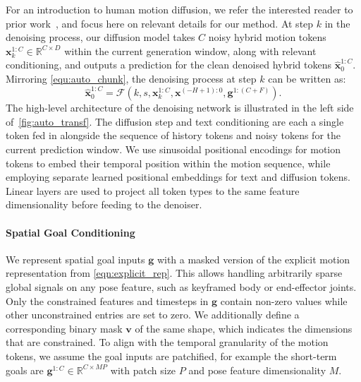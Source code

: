 For an introduction to human motion diffusion, we refer the interested reader to prior work~\cite{tevet2023mdm,zhang2024motiondiffuse}, and focus here on relevant details for our method. 
At step $k$ in the denoising process, our diffusion model takes $C$ noisy hybrid motion tokens $\mathbf{x}^{1:C}_k \in \mathbb{R}^{C \times D}$ within the current generation window, along with relevant conditioning, and outputs a prediction for the clean denoised hybrid tokens $\hat{\mathbf{x}}^{1:C}_0$.
Mirroring \cref{equ:auto_chunk}, the denoising process at step $k$ can be written as:
\begin{equation}
    \hat{\mathbf{x}}^{1:C}_0 = \mathcal{F}(k, s, \mathbf{x}^{1:C}_k, \mathbf{x}^{(-H+1):0}, \mathbf{g}^{1:(C+F)}).
\label{eqn:denoiser}
\end{equation}
The high-level architecture of the denoising network is illustrated in the left side of~\cref{fig:auto_transf}.
The diffusion step and text conditioning are each a single token fed in alongside the sequence of history tokens and noisy tokens for the current prediction window. 
We use sinusoidal positional encodings for motion tokens to embed their temporal position within the motion sequence, while employing separate learned positional embeddings for text and diffusion tokens.
Linear layers are used to project all token types to the same feature dimensionality before feeding to the denoiser.

\paragraph{Spatial Goal Conditioning}
We represent spatial goal inputs $\mathbf{g}$ with a masked version of the explicit motion representation from \cref{eqn:explicit_rep}. This allows handling arbitrarily sparse global signals on any pose feature, such as keyframed body or end-effector joints. Only the constrained features and timesteps in $\mathbf{g}$ contain non-zero values while other unconstrained entries are set to zero.
We additionally define a corresponding binary mask $\mathbf{v}$ of the same shape, which indicates the dimensions that are constrained.
To align with the temporal granularity of the motion tokens, we assume the goal inputs are patchified, for example the short-term goals are $\mathbf{g}^{1:C} \in \mathbb{R}^{C \times MP}$ with patch size $P$ and pose feature dimensionality $M$.

